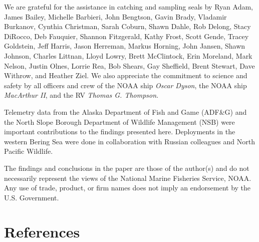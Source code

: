 \documentclass[fleqn,10pt,lineno]{wlpeerj} %
\begin{document}
We are grateful for the assistance in catching and sampling seals by Ryan Adam,
James Bailey, Michelle Barbieri, John Bengtson, Gavin Brady, Vladamir Burkanov,
Cynthia Christman, Sarah Coburn, Shawn Dahle, Rob Delong, Stacy DiRocco, Deb
Fauquier, Shannon Fitzgerald, Kathy Frost, Scott Gende, Tracey Goldstein, Jeff
Harris, Jason Herreman, Markus Horning, John Jansen, Shawn Johnson, Charles
Littnan, Lloyd Lowry, Brett McClintock, Erin Moreland, Mark Nelson, Justin
Olnes, Lorrie Rea, Bob Shears, Gay Sheffield, Brent Stewart, Dave Withrow, and
Heather Ziel. We also appreciate the commitment to science and safety by all
officers and crew of the NOAA ship \emph{Oscar Dyson}, the NOAA ship \emph{MacArthur II}, and
the RV \emph{Thomas G. Thompson}.

Telemetry data from the Alaska Department of Fish and Game (ADF\&G) and the North
Slope Borough Department of Wildlife Management (NSB) were important
contributions to the findings presented here. Deployments in the western Bering
Sea were done in collaboration with Russian colleagues and North Pacific
Wildlife.

The findings and conclusions in the paper are those of the author(s) and do not
necessarily represent the views of the National Marine Fisheries Service, NOAA.
Any use of trade, product, or firm names does not imply an endorsement by the
U.S. Government.

\section*{References}\label{references}
\end{document}
